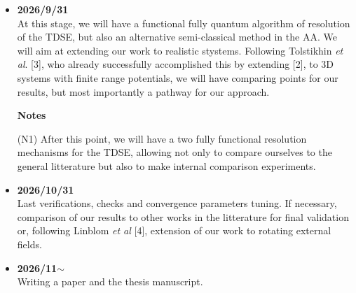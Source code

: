 \documentclass[11pt]{article}
\begin{document}
\begin{itemize}
\item \textbf{2026/9/31} \\
    At this stage, we will have a functional fully quantum algorithm of 
		resolution of the TDSE, 
		but also an alternative semi-classical method in the AA. 
		We will aim at extending our work to realistic stystems.
	        Following Tolstikhin \textit{et al}. [3], who already 
		successfully accomplished this by extending [2], to  
		3D systems with finite range potentials, we will have
		comparing points for our results, but most importantly a
		pathway for our approach.


\textbf{Notes} 
    
    (N1) After this point, we will have a two fully functional resolution 
         mechanisms for the TDSE, allowing not only to compare ourselves 
  	 to the general litterature but also to make internal comparison 
	 experiments.
	

\item \textbf{2026/10/31} \\
Last verifications, checks and convergence parameters tuning. If necessary, 
comparison of our results to other works in the litterature 
		for final validation or, following Linblom \textit{et al} [4],
		extension of our work to rotating external fields.

        
\item \textbf{2026/11$\sim$} \\
	Writing a paper and the thesis manuscript. 
\end{itemize}
\end{document}
